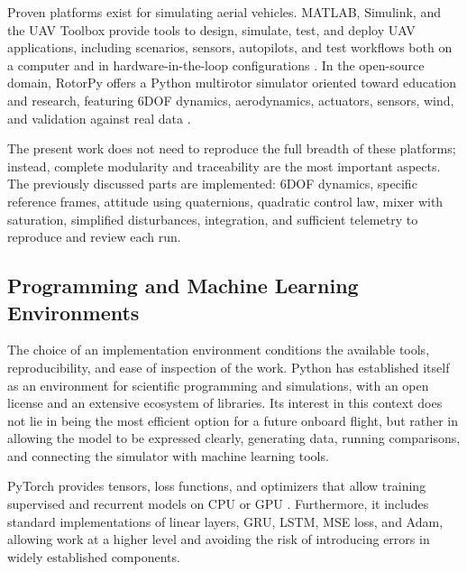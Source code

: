 Proven platforms exist for simulating aerial vehicles. MATLAB, Simulink, and the UAV Toolbox provide tools to design, simulate, test, and deploy UAV applications, including scenarios, sensors, autopilots, and test workflows both on a computer and in hardware-in-the-loop configurations \cite{mathworksUAVToolbox}. In the open-source domain, RotorPy offers a Python multirotor simulator oriented toward education and research, featuring 6DOF dynamics, aerodynamics, actuators, sensors, wind, and validation against real data \cite{folk2023rotorpy}.

The present work does not need to reproduce the full breadth of these platforms; instead, complete modularity and traceability are the most important aspects. The previously discussed parts are implemented: 6DOF dynamics, specific reference frames, attitude using quaternions, quadratic control law, mixer with saturation, simplified disturbances, integration, and sufficient telemetry to reproduce and review each run.

\subsection{Programming and Machine Learning Environments}

The choice of an implementation environment conditions the available tools, reproducibility, and ease of inspection of the work. Python has established itself as an environment for scientific programming and simulations, with an open license and an extensive ecosystem of libraries. Its interest in this context does not lie in being the most efficient option for a future onboard flight, but rather in allowing the model to be expressed clearly, generating data, running comparisons, and connecting the simulator with machine learning tools.

PyTorch provides tensors, loss functions, and optimizers that allow training supervised and recurrent models on CPU or GPU \cite{pytorchDocs}. Furthermore, it includes standard implementations of linear layers, GRU, LSTM, MSE loss, and Adam, allowing work at a higher level and avoiding the risk of introducing errors in widely established components.

